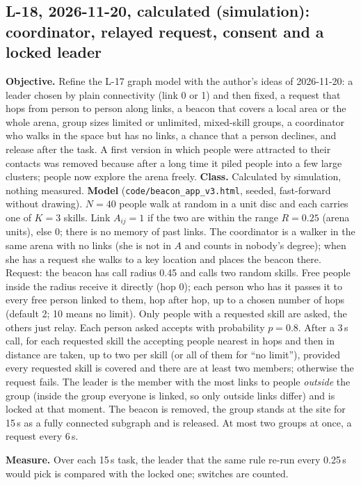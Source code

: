 \IfFileExists{IEEEtran.cls}{\documentclass[conference]{IEEEtran}}{\documentclass[10pt,twocolumn]{article}}
\begin{document}
\subsection*{L-18, 2026-11-20, calculated (simulation): coordinator, relayed request, consent and a locked leader}
\textbf{Objective.} Refine the L-17 graph model with the author's ideas of 2026-11-20: a leader chosen by plain connectivity (link 0 or 1) and then fixed, a request that hops from person to person along links, a beacon that covers a local area or the whole arena, group sizes limited or unlimited, mixed-skill groups, a coordinator who walks in the space but has no links, a chance that a person declines, and release after the task. A first version in which people were attracted to their contacts was removed because after a long time it piled people into a few large clusters; people now explore the arena freely. \textbf{Class.} Calculated by simulation, nothing measured. \textbf{Model} (\texttt{code/beacon\_app\_v3.html}, seeded, fast-forward without drawing). $N=40$ people walk at random in a unit disc and each carries one of $K=3$ skills. Link $A_{ij}=1$ if the two are within the range $R=0.25$ (arena units), else 0; there is no memory of past links. The coordinator is a walker in the same arena with no links (she is not in $A$ and counts in nobody's degree); when she has a request she walks to a key location and places the beacon there. Request: the beacon has call radius 0.45 and calls two random skills. Free people inside the radius receive it directly (hop 0); each person who has it passes it to every free person linked to them, hop after hop, up to a chosen number of hops (default 2; 10 means no limit). Only people with a requested skill are asked, the others just relay. Each person asked accepts with probability $p=0.8$. After a 3\,s call, for each requested skill the accepting people nearest in hops and then in distance are taken, up to two per skill (or all of them for ``no limit''), provided every requested skill is covered and there are at least two members; otherwise the request fails. The leader is the member with the most links to people \emph{outside} the group (inside the group everyone is linked, so only outside links differ) and is locked at that moment. The beacon is removed, the group stands at the site for 15\,s as a fully connected subgraph and is released. At most two groups at once, a request every 6\,s.

\textbf{Measure.} Over each 15\,s task, the leader that the same rule re-run every 0.25\,s would pick is compared with the locked one; switches are counted.
\end{document}
